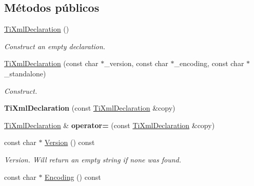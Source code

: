\subsection*{Métodos públicos}
\begin{DoxyCompactItemize}
\item 
\hypertarget{class_ti_xml_declaration_aa0484d059bea0ea1acb47c9094382d79}{\hyperlink{class_ti_xml_declaration_aa0484d059bea0ea1acb47c9094382d79}{Ti\-Xml\-Declaration} ()}\label{class_ti_xml_declaration_aa0484d059bea0ea1acb47c9094382d79}

\begin{DoxyCompactList}\small\item\em Construct an empty declaration. \end{DoxyCompactList}\item 
\hypertarget{class_ti_xml_declaration_a3b618d1c30c25e4b7a71f31a595ee298}{\hyperlink{class_ti_xml_declaration_a3b618d1c30c25e4b7a71f31a595ee298}{Ti\-Xml\-Declaration} (const char $\ast$\-\_\-version, const char $\ast$\-\_\-encoding, const char $\ast$\-\_\-standalone)}\label{class_ti_xml_declaration_a3b618d1c30c25e4b7a71f31a595ee298}

\begin{DoxyCompactList}\small\item\em Construct. \end{DoxyCompactList}\item 
\hypertarget{class_ti_xml_declaration_a58ac9042c342f7845c8491da0bb091e8}{{\bfseries Ti\-Xml\-Declaration} (const \hyperlink{class_ti_xml_declaration}{Ti\-Xml\-Declaration} \&copy)}\label{class_ti_xml_declaration_a58ac9042c342f7845c8491da0bb091e8}

\item 
\hypertarget{class_ti_xml_declaration_a3bc617efe11014ff2b1a9c5727c37a9a}{\hyperlink{class_ti_xml_declaration}{Ti\-Xml\-Declaration} \& {\bfseries operator=} (const \hyperlink{class_ti_xml_declaration}{Ti\-Xml\-Declaration} \&copy)}\label{class_ti_xml_declaration_a3bc617efe11014ff2b1a9c5727c37a9a}

\item 
\hypertarget{class_ti_xml_declaration_a02ee557b1a4545c3219ed377c103ec76}{const char $\ast$ \hyperlink{class_ti_xml_declaration_a02ee557b1a4545c3219ed377c103ec76}{Version} () const }\label{class_ti_xml_declaration_a02ee557b1a4545c3219ed377c103ec76}

\begin{DoxyCompactList}\small\item\em Version. Will return an empty string if none was found. \end{DoxyCompactList}\item 
\hypertarget{class_ti_xml_declaration_a5d974231f9e9a2f0542f15f3a46cdb76}{const char $\ast$ \hyperlink{class_ti_xml_declaration_a5d974231f9e9a2f0542f15f3a46cdb76}{Encoding} () const }\label{class_ti_xml_declaration_a5d974231f9e9a2f0542f15f3a46cdb76}


\end{DoxyCompactItemize}
